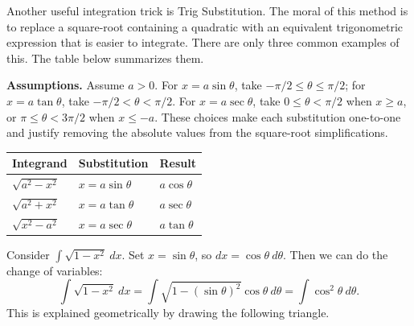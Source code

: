 Another useful integration trick is Trig Substitution. The moral of this method is to replace a square-root containing a quadratic with an equivalent trigonometric expression that is easier to integrate. There are only three common examples of this. The table below summarizes them.

\noindent\textbf{Assumptions.} Assume $a>0$. For $x=a\sin\theta$, take
$-\pi/2\le\theta\le\pi/2$; for $x=a\tan\theta$, take
$-\pi/2<\theta<\pi/2$. For $x=a\sec\theta$, take
$0\le\theta<\pi/2$ when $x\ge a$, or $\pi\le\theta<3\pi/2$ when $x\le-a$.
These choices make each substitution one-to-one and justify removing the
absolute values from the square-root simplifications.

\begin{center}
    \def\arraystretch{1.5}
    \begin{tabular}{@{}lll@{}}
        \toprule[0.4mm]
        Integrand & Substitution & Result \\
        \hline
        $\sqrt{a^2-x^2}$ & $x=a\sin\theta$ & $a\cos\theta$ \\
        $\sqrt{a^2+x^2}$ & $x=a\tan\theta$ & $a\sec\theta$ \\
        $\sqrt{x^2-a^2}$ & $x=a\sec\theta$ & $a\tan\theta$ \\
        \bottomrule[0.4mm]
    \end{tabular}
\end{center}

\begin{exampleblock}
Consider $\int\sqrt{1-x^2}\ dx$. Set $x=\sin\theta$, so $dx=\cos\theta\ d\theta$. Then we can do the change of variables:
$$\int\sqrt{1-x^2}\ dx
=\int\sqrt{1-(\sin\theta)^2}\cos\theta\ d\theta
=\int\cos^2\theta\ d\theta.$$
This is explained geometrically by drawing the following triangle. 
\begin{center}
    
\end{center}
\end{exampleblock}
